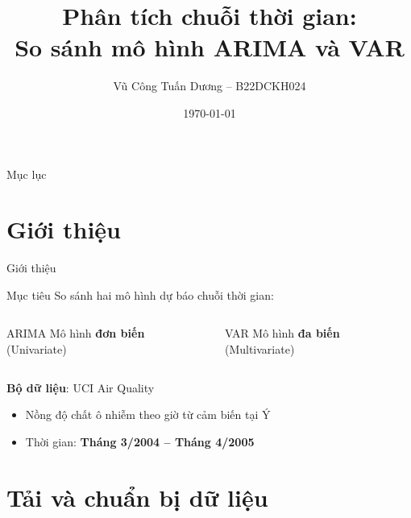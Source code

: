\documentclass[serif, aspectratio=169]{beamer}
\author{Vũ Công Tuấn Dương -- B22DCKH024}
\title{Phân tích chuỗi thời gian:\\So sánh mô hình ARIMA và VAR}
\institute{Khoa CNTT1 -- PTIT}
\date{\small \today}
\newcommand{\highlight}[1]{\textbf{\color{hkustblue}#1}}
\begin{document}
\begin{frame}
    \titlepage
\end{frame}

\begin{frame}{Mục lục}
    \tableofcontents
\end{frame}

\section{Giới thiệu}

\begin{frame}{Giới thiệu}
    \begin{block}{Mục tiêu}
        So sánh hai mô hình dự báo chuỗi thời gian:
    \end{block}

    \vspace{0.3cm}
    \begin{columns}
        \begin{block}{ARIMA}
            Mô hình \highlight{đơn biến} (Univariate)
        \end{block}

        \begin{block}{VAR}
            Mô hình \highlight{đa biến} (Multivariate)
        \end{block}
    \end{columns}

    \vspace{0.5cm}
    \textbf{Bộ dữ liệu}: UCI Air Quality
    \begin{itemize}
        \item Nồng độ chất ô nhiễm theo giờ từ cảm biến tại Ý
        \item Thời gian: \highlight{Tháng 3/2004 -- Tháng 4/2005}
    \end{itemize}
\end{frame}

\section{Tải và chuẩn bị dữ liệu}
\end{document}
